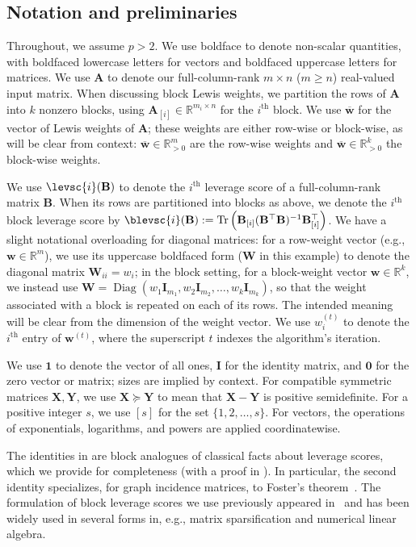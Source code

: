 \documentclass[11pt]{article}
\theoremstyle{plain}
\numberwithin{equation}{section}
\newcommand{\R}{\mathbb{R}}
\newcommand{\one}{\mathbf{1}}
\newcommand{\Diag}{\operatorname{Diag}}
\newcommand{\Tr}{\operatorname{Tr}}
\newcommand{\Rmspos}{\mathbb{R}^m_{>0}}
\newcommand{\Rkpos}{\mathbb{R}_{>0}^k}
\newcommand{\bA}{\mathbf{A}}
\newcommand{\bB}{\mathbf{B}}
\newcommand{\bI}{\mathbf{I}}
\newcommand{\bW}{\mathbf{W}}
\newcommand{\bX}{\mathbf{X}}
\newcommand{\bY}{\mathbf{Y}}
\newcommand{\bzero}{\mathbf{0}}
\newcommand{\bw}{\mathbf{w}}
\newcommand{\bwbar}{\overline{\mathbf{w}}}
\newcommand{\bAblk}[1]{\mathbf{A}_{[#1]}}
\newcommand{\bBblk}[1]{\mathbf{B}_{[#1]}}
\begin{document}
\subsection{Notation and preliminaries}\label{sec:intro-notationPrelims}

Throughout, we assume $p>2$. We use boldface to denote non-scalar quantities, with boldfaced lowercase letters for vectors and boldfaced uppercase letters for matrices. We use $\bA$ to denote our full-column-rank $m\times n$ ($m\geq n$) real-valued input matrix. When discussing block Lewis weights, we partition the rows of $\bA$ into $k$ nonzero blocks, using $\bAblk{i}\in\R^{m_i\times n}$ for the $i^\mathrm{th}$ block. We use $\bwbar$ for the vector of Lewis weights of $\bA$; these weights are either row-wise or block-wise, as will be clear from context: $\bwbar\in\Rmspos$ are the row-wise weights and $\bwbar\in\Rkpos$ the block-wise weights.

We use $\levsc{i}(\bB)$ to denote the $i^\mathrm{th}$ leverage score of a full-column-rank matrix $\bB$. When its rows are partitioned into blocks as above, we denote the $i^\mathrm{th}$ block leverage score by $\blevsc{i}(\bB):=\Tr\left(\bBblk{i}(\bB^\top\bB)^{-1}\bBblk{i}^\top\right)$. We have a slight notational overloading for diagonal matrices: for a row-weight vector (e.g., $\bw\in\R^m$), we use its uppercase boldfaced form ($\bW$ in this example) to denote the diagonal matrix $\bW_{ii}=w_i$; in the block setting, for a block-weight vector $\bw\in\R^k$, we instead use $\bW=\Diag\left(w_1\bI_{m_1},w_2\bI_{m_2},\dotsc,w_k\bI_{m_k}\right)$, so that the weight associated with a block is repeated on each of its rows. The intended meaning will be clear from the dimension of the weight vector. We use $w_i^{(t)}$ to denote the $i^\mathrm{th}$ entry of $\bw^{(t)}$, where the superscript $t$ indexes the algorithm's iteration.

We use $\one$ to denote the vector of all ones, $\bI$ for the identity matrix, and $\bzero$ for the zero vector or matrix;  sizes are implied by context. For compatible symmetric matrices $\bX,\bY$, we use $\bX\succeq\bY$ to mean that $\bX-\bY$ is positive semidefinite. For a positive integer $s$, we use $[s]$ for the set $\{1,2,\dotsc,s\}$. For vectors, the operations of exponentials, logarithms, and powers are applied coordinatewise.


The identities in  are block analogues of classical facts about leverage scores, which we provide for completeness (with a proof in ). In particular, the second identity specializes, for graph incidence matrices, to Foster's theorem~\cite{foster1949average}. The formulation of block leverage scores we use previously appeared in~\cite{KLPSS16,xu2016sub} and has been widely used in several forms in, e.g., matrix sparsification and numerical linear algebra.
\end{document}
